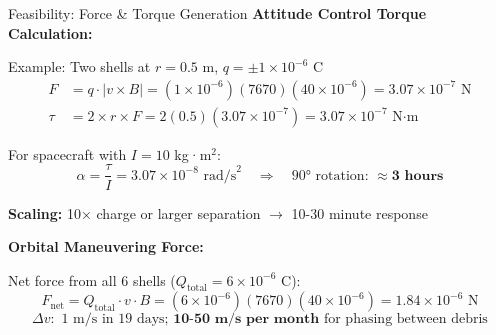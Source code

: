 \documentclass[aspectratio=169]{beamer}
\begin{document}
\begin{frame}{Feasibility: Force \& Torque Generation}
\textbf{Attitude Control Torque Calculation:}

Example: Two shells at $r = 0.5$ m, $q = \pm 1 \times 10^{-6}$ C
\begin{align}
F &= q \cdot |v \times B| = (1 \times 10^{-6})(7670)(40 \times 10^{-6}) = 3.07 \times 10^{-7}\text{ N} \\
\tau &= 2 \times r \times F = 2(0.5)(3.07 \times 10^{-7}) = 3.07 \times 10^{-7}\text{ N·m}
\end{align}

For spacecraft with $I = 10$ kg·m$^2$:
\begin{equation}
\alpha = \frac{\tau}{I} = 3.07 \times 10^{-8} \text{ rad/s}^2 \quad \Rightarrow \quad \text{90° rotation: } \approx \textbf{3 hours}
\end{equation}

\textbf{Scaling:} 10× charge or larger separation $\rightarrow$ 10-30 minute response

\vspace{0.3cm}
\textbf{Orbital Maneuvering Force:}

Net force from all 6 shells ($Q_{\text{total}} = 6 \times 10^{-6}$ C):
\begin{equation}
F_{\text{net}} = Q_{\text{total}} \cdot v \cdot B = (6 \times 10^{-6})(7670)(40 \times 10^{-6}) = 1.84 \times 10^{-6}\text{ N}
\end{equation}
\begin{equation}
\Delta v: \text{ 1 m/s in 19 days; } \textbf{10-50 m/s per month} \text{ for phasing between debris}
\end{equation}
\end{frame}
\end{document}
